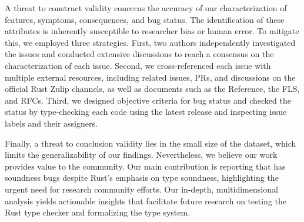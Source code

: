 A threat to construct validity concerns the accuracy of our characterization of
features, symptoms, consequences, and bug status.
%
The identification of these attributes is inherently susceptible to researcher
bias or human error.
%
To mitigate this, we employed three strategies.
%
First, two authors independently investigated the issues and conducted extensive
discussions to reach a consensus on the characterization of each issue.
%
Second, we cross-referenced each issue with multiple external resources,
including related issues, PRs, and discussions on the official Rust Zulip
channels, as well as documents such as the Reference, the FLS, and RFCs.
%
Third, we designed objective criteria for bug status and checked the status by
type-checking each code using the latest \rustc{} release and inspecting issue
labels and their assigners.

Finally, a threat to conclusion validity lies in the small size of the dataset,
which limits the generalizability of our findings.
%
Nevertheless, we believe our work provides value to the community.
%
Our main contribution is reporting that \rustc{} has soundness bugs despite
Rust's emphasis on type soundness, highlighting the urgent need for research
community efforts.
%
Our in-depth, multidimensional analysis yields actionable insights that
facilitate future research on testing the Rust type checker and formalizing the
type system.
